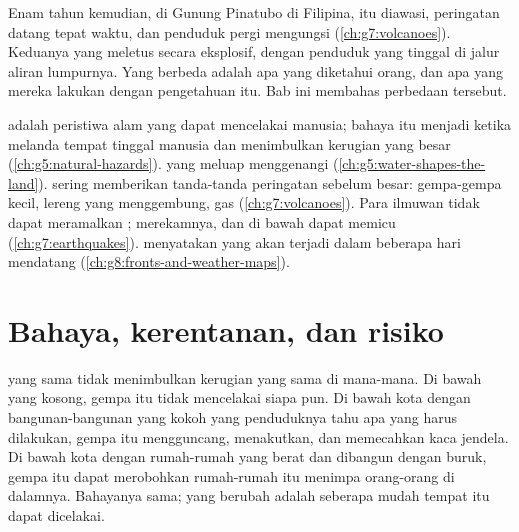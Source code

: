Enam tahun kemudian, di Gunung Pinatubo di Filipina,  itu
diawasi, peringatan datang tepat waktu, dan penduduk pergi mengungsi
(\cref{ch:g7:volcanoes}). Keduanya  yang meletus secara
eksplosif, dengan penduduk yang tinggal di jalur aliran lumpurnya. Yang
berbeda adalah apa yang diketahui orang, dan apa yang mereka lakukan
dengan pengetahuan itu. Bab ini membahas perbedaan tersebut.

\begin{recall}
\emph{} adalah peristiwa alam yang dapat mencelakai manusia;
bahaya itu menjadi \emph{} ketika melanda tempat tinggal
manusia dan menimbulkan kerugian yang besar (\cref{ch:g5:natural-hazards}).
 yang meluap menggenangi 
(\cref{ch:g5:water-shapes-the-land}).  sering memberikan
tanda-tanda peringatan sebelum  besar: gempa-gempa kecil, lereng
yang menggembung, gas (\cref{ch:g7:volcanoes}). Para ilmuwan tidak dapat
meramalkan ;  merekamnya, dan  di bawah 
dapat memicu  (\cref{ch:g7:earthquakes}). 
menyatakan  yang akan terjadi dalam beberapa hari mendatang
(\cref{ch:g8:fronts-and-weather-maps}).
\end{recall}

\section{Bahaya, kerentanan, dan risiko}

 yang sama tidak menimbulkan kerugian yang sama di mana-mana. Di
bawah  yang kosong, gempa itu tidak mencelakai siapa pun. Di bawah
kota dengan bangunan-bangunan yang kokoh yang penduduknya tahu apa yang
harus dilakukan, gempa itu mengguncang, menakutkan, dan memecahkan kaca
jendela. Di bawah kota dengan rumah-rumah yang berat dan dibangun dengan
buruk, gempa itu dapat merobohkan rumah-rumah itu menimpa orang-orang di
dalamnya. Bahayanya sama; yang berubah adalah seberapa mudah tempat itu
dapat dicelakai.

